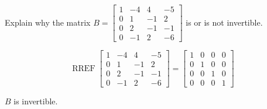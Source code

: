
\begin{exerciseStatement}


Explain why the matrix \(B= \left[\begin{array}{cccc}
1 & -4 & 4 & -5 \\
0 & 1 & -1 & 2 \\
0 & 2 & -1 & -1 \\
0 & -1 & 2 & -6
\end{array}\right] \) is or is not invertible.


\end{exerciseStatement}
    
\begin{exerciseAnswer} 


\[\operatorname{RREF} \left[\begin{array}{cccc}
1 & -4 & 4 & -5 \\
0 & 1 & -1 & 2 \\
0 & 2 & -1 & -1 \\
0 & -1 & 2 & -6
\end{array}\right] = \left[\begin{array}{cccc}
1 & 0 & 0 & 0 \\
0 & 1 & 0 & 0 \\
0 & 0 & 1 & 0 \\
0 & 0 & 0 & 1
\end{array}\right] \]

\(B\) is invertible.
\end{exerciseAnswer}
    
